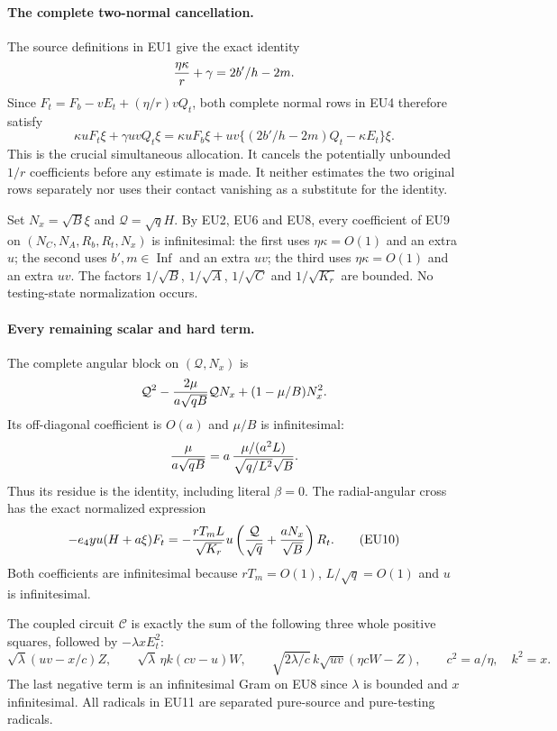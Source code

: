 \paragraph{The complete two-normal cancellation.}
The source definitions in EU1 give the exact identity
\[
             {\eta\kappa\over r}+\gamma=2b'/h-2m.
\]
Since $F_t=F_b-vE_t+(\eta/r)vQ_t$, both complete normal rows in EU4
therefore satisfy
\[
\boxed{\quad
 \kappa uF_t\xi+\gamma uvQ_t\xi
 =\kappa uF_b\xi
     +uv\{(2b'/h-2m)Q_t-\kappa E_t\}\xi .\quad}       \tag{EU9}
\]
This is the crucial simultaneous allocation. It cancels the potentially
unbounded $1/r$ coefficients before any estimate is made. It neither
estimates the two original rows separately nor uses their contact
vanishing as a substitute for the identity.

Set $N_x=\sqrt B\xi$ and $\mathcal Q=\sqrt q H$.
By EU2, EU6 and EU8, every coefficient of EU9 on
$(N_C,N_A,R_b,R_t,N_x)$ is infinitesimal: the first uses
$\eta\kappa=O(1)$ and an extra $u$; the second uses
$b',m\in\operatorname{Inf}$ and an extra $uv$; the third uses
$\eta\kappa=O(1)$ and an extra $uv$.
The factors $1/\sqrt B$, $1/\sqrt A$, $1/\sqrt C$ and
$1/\sqrt{K_r}$ are bounded. No testing-state normalization occurs.

\paragraph{Every remaining scalar and hard term.}
The complete angular block on $(\mathcal Q,N_x)$ is
\[
 \mathcal Q^2-{2\mu\over a\sqrt{qB}}\mathcal QN_x
                         +(1-\mu/B)N_x^2.
\]
Its off-diagonal coefficient is $O(a)$ and $\mu/B$ is infinitesimal:
\[
 {\mu\over a\sqrt{qB}}
   =a\,{\mu/(a^2L)\over\sqrt{q/L^2}\sqrt B}.
\]
Thus its residue is the identity, including literal $\beta=0$.
The radial-angular cross has the exact normalized expression
\[
 -e_4yu(H+a\xi)F_t
 =-{rT_mL\over\sqrt{K_r}}u
       \left({\mathcal Q\over\sqrt q}
                         +{aN_x\over\sqrt B}\right)R_t.          \tag{EU10}
\]
Both coefficients are infinitesimal because $rT_m=O(1)$,
$L/\sqrt q=O(1)$ and $u$ is infinitesimal.

The coupled circuit $\mathscr C$ is exactly the sum of the following
three whole positive squares, followed by $-\lambda xE_t^2$:
\[
 \sqrt\lambda(uv-x/c)Z,\qquad
 \sqrt\lambda\,\eta k(cv-u)W,\qquad
 \sqrt{2\lambda/c}\,k\sqrt{uv}(\eta cW-Z),
 \qquad c^2=a/\eta,\quad k^2=x.                       \tag{EU11}
\]
The last negative term is an infinitesimal Gram on EU8 since
$\lambda$ is bounded and $x$ infinitesimal. All radicals in EU11
are separated pure-source and pure-testing radicals.

